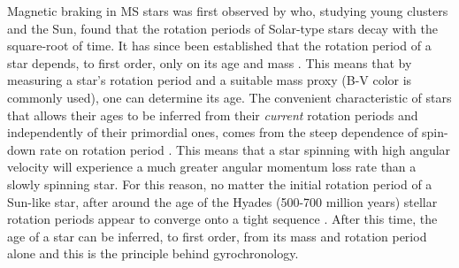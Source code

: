 Magnetic braking in MS stars was first observed by \citet{Skumanich1972} who,
studying young clusters and the Sun, found that the rotation periods of
Solar-type stars decay with the square-root of time.
It has since been established that the rotation period of a star depends, to
first order, only on its age and mass \citep[\eg][]{barnes2003}.
This means that by measuring a star's rotation period and a suitable mass
proxy (B-V color is commonly used), one can determine its age.
The convenient characteristic of stars that allows their ages to be inferred
from their {\it current} rotation periods and independently of their
primordial ones, comes from the steep dependence of spin-down rate on rotation
period \citep{kawaler1989}.
This means that a star spinning with high angular velocity will experience a
much greater angular momentum loss rate than a slowly spinning star.
For this reason, no matter the initial rotation period of a Sun-like star,
after around the age of the Hyades (500-700 million years) stellar rotation
periods appear to converge onto a tight sequence \citep{irwin2009}.
After this time, the age of a star can be inferred, to first order, from its
mass and rotation period alone and this is the principle behind gyrochronology.


